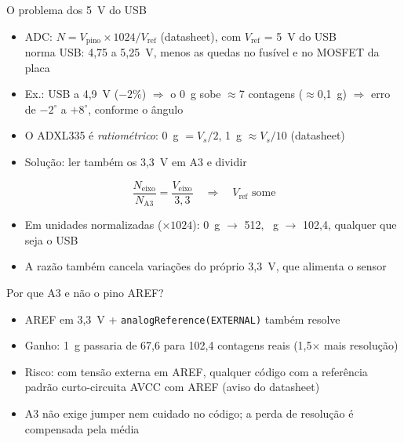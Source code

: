 \documentclass[aspectratio=169]{beamer}
\begin{document}
\begin{frame}{O problema dos 5~V do USB}
\small
\begin{itemize}
  \item ADC: $N = V_\text{pino}\times1024/V_\text{ref}$ (datasheet), com $V_\text{ref}$ = 5~V do USB
    \\ norma USB: 4,75 a 5,25~V, menos as quedas no fusível e no MOSFET da placa
  \item Ex.: USB a 4,9~V ($-2\%$) $\Rightarrow$ o 0~g sobe $\approx$7 contagens ($\approx$0,1~g)
    $\Rightarrow$ erro de $-2^\circ$ a $+8^\circ$, conforme o ângulo
  \item O ADXL335 é \emph{ratiométrico}: 0~g $= V_s/2$, 1~g $\approx V_s/10$ (datasheet)
  \item Solução: ler também os 3,3~V em A3 e dividir
\end{itemize}
\[
  \frac{N_\text{eixo}}{N_\text{A3}} = \frac{V_\text{eixo}}{3{,}3}
  \quad\Rightarrow\quad V_\text{ref}\text{ some}
\]
\begin{itemize}
  \item Em unidades normalizadas ($\times1024$): 0~g $\to$ 512, ~g $\to$ 102,4, qualquer que seja o USB
  \item A razão também cancela variações do próprio 3,3~V, que alimenta o sensor
\end{itemize}
\end{frame}

\begin{frame}{Por que A3 e não o pino AREF?}
\begin{itemize}
  \item AREF em 3,3~V + \texttt{analogReference(EXTERNAL)} também resolve
  \item Ganho: 1~g passaria de 67,6 para 102,4 contagens reais (1,5$\times$ mais resolução)
  \item Risco: com tensão externa em AREF, qualquer código com a referência padrão
    curto-circuita AVCC com AREF (aviso do datasheet)
  \item A3 não exige jumper nem cuidado no código; a perda de resolução é compensada pela média
\end{itemize}
\end{frame}
\end{document}
